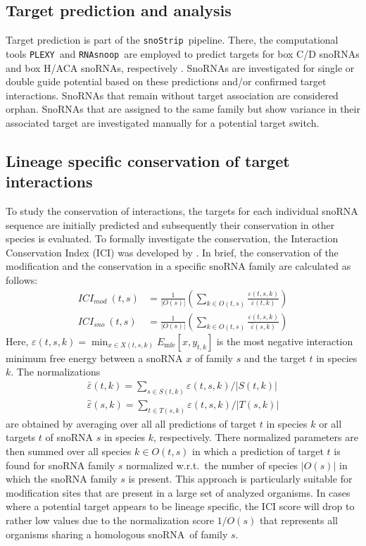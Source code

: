 \documentclass[preprint,3p,times,twocolumn]{elsarticle}
\newcommand{\sno}{snoRNA}
\newcommand{\cd}{box C/D snoRNA}
\newcommand{\haca}{box H/ACA snoRNA}
\newcommand{\snostrip}{\texttt{snoStrip}}
\newcommand{\plexy}{\texttt{PLEXY}}
\newcommand{\snoop}{\texttt{RNAsnoop}}
\begin{document}
\subsection{Target prediction and analysis}

Target prediction is part of the \snostrip\ pipeline. There, the
computational tools \plexy\ and \snoop\ are employed to predict
targets for \cd s and \haca s, respectively \cite{Kehr:2011,
  Tafer:2010}.  SnoRNAs are investigated for single or double guide
potential based on these predictions and/or confirmed target
interactions. SnoRNAs that remain without target association are
considered orphan. SnoRNAs that are assigned to the same family but
show variance in their associated target are investigated manually for
a potential target switch.

\subsection{Lineage specific conservation of target interactions}
To study the conservation of interactions, the targets for each
individual snoRNA sequence are initially predicted and subsequently
their conservation in other species is evaluated. To formally
investigate the conservation, the Interaction Conservation Index (ICI)
was developed by \cite{Kehr:2014}. In brief, the conservation of the
modification and the conservation in a specific snoRNA family are
calculated as follows:
\begin{equation}
  \begin{split}
    ICI_{mod}\:(t,s) & = \frac{1}{|O(s)|} \left( \sum_{k\in O(t,s)} \frac{\varepsilon(t,s,k)}{\bar\varepsilon(t,k)} \right) \\
    ICI_{sno}\:(t,s) & = \frac{1}{|O(s)|} \left( \sum_{k\in O(t,s)} \frac{\varepsilon(t,s,k)}{\hat\varepsilon(s,k)} \right)
  \end{split}
\end{equation}
Here, $ \varepsilon(t,s,k) = \min_{x\in X(t,s,k)}
E_{\textrm{mfe}}[x,y_{t,k}] $ is the most negative interaction minimum free
energy between a snoRNA $x$ of family $s$ and the target $t$ in species
$k$. The normalizations 
\begin{equation}
\begin{split}
\bar\varepsilon(t,k)=\sum_{s\in
  S(t,k)}\varepsilon(t,s,k)/|S(t,k)| \\
 \hat\varepsilon(s,k)=\sum_{t\in
  T(s,k)}\varepsilon(t,s,k)/|T(s,k)|
\end{split}
\end{equation}
are obtained by averaging over all all predictions of target $t$ in
species $k$ or all targets $t$ of snoRNA $s$ in species $k$,
respectively.  There normalized parameters are then summed over all
species $k\in O(t,s)$ in which a prediction of target $t$ is found for
snoRNA family $s$ normalized w.r.t.\ the number of species $|O(s)|$ in
which the snoRNA family $s$ is present. This approach is particularly
suitable for modification sites that are present in a large set of
analyzed organisms. In cases where a potential target appears to be
lineage specific, the ICI score will drop to rather low values due to
the normalization score $1/O(s)$ that represents all organisms sharing
a homologous \sno\ of family $s$.
\end{document}
